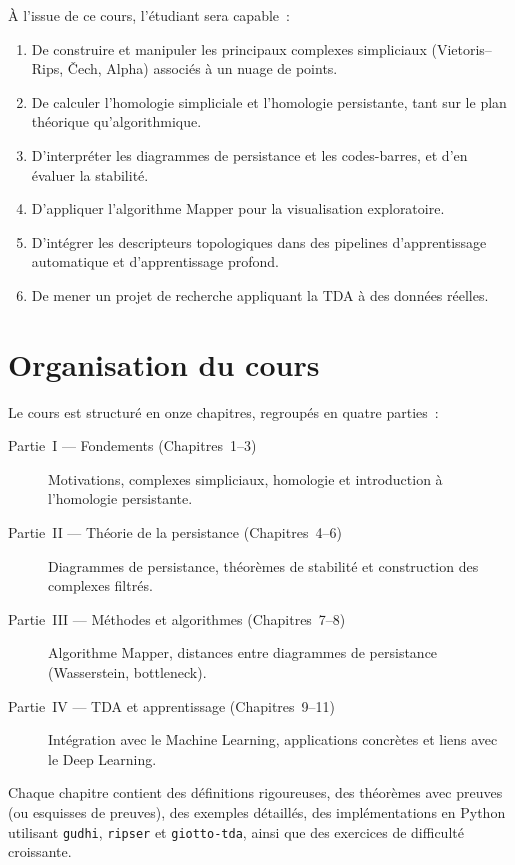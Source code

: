 \`A l'issue de ce cours, l'\'etudiant sera capable~:
\begin{enumerate}
  \item De construire et manipuler les principaux complexes simpliciaux
        (Vietoris--Rips, \v{C}ech, Alpha) associ\'es \`a un nuage de points.
  \item De calculer l'homologie simpliciale et l'homologie persistante,
        tant sur le plan th\'eorique qu'algorithmique.
  \item D'interpr\'eter les diagrammes de persistance et les codes-barres,
        et d'en \'evaluer la stabilit\'e.
  \item D'appliquer l'algorithme Mapper pour la visualisation exploratoire.
  \item D'int\'egrer les descripteurs topologiques dans des pipelines
        d'apprentissage automatique et d'apprentissage profond.
  \item De mener un projet de recherche appliquant la TDA \`a des donn\'ees
        r\'eelles.
\end{enumerate}

\section*{Organisation du cours}

Le cours est structur\'e en onze chapitres, regroup\'es en quatre parties~:

\begin{description}
  \item[Partie~I --- Fondements (Chapitres~1--3)]
    Motivations, complexes simpliciaux, homologie et introduction
    \`a l'homologie persistante.
  \item[Partie~II --- Th\'eorie de la persistance (Chapitres~4--6)]
    Diagrammes de persistance, th\'eor\`emes de stabilit\'e et construction
    des complexes filtr\'es.
  \item[Partie~III --- M\'ethodes et algorithmes (Chapitres~7--8)]
    Algorithme Mapper, distances entre diagrammes de persistance
    (Wasserstein, bottleneck).
  \item[Partie~IV --- TDA et apprentissage (Chapitres~9--11)]
    Int\'egration avec le Machine Learning, applications concr\`etes
    et liens avec le Deep Learning.
\end{description}

Chaque chapitre contient des d\'efinitions rigoureuses, des th\'eor\`emes avec
preuves (ou esquisses de preuves), des exemples d\'etaill\'es, des
impl\'ementations en Python utilisant \texttt{gudhi}, \texttt{ripser} et
\texttt{giotto-tda}, ainsi que des exercices de difficult\'e croissante.

